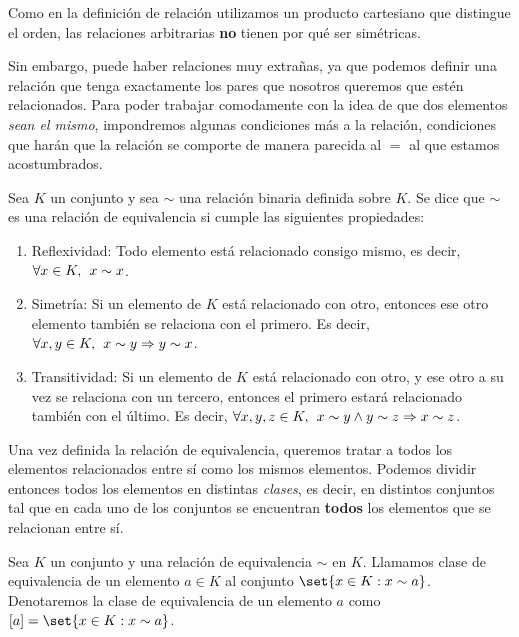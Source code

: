 \documentclass[../algebra_lineal.tex]{subfiles}
\begin{document}
\begin{remark}
    Como en la definición de relación utilizamos un producto cartesiano que distingue el orden, las relaciones arbitrarias \textbf{no} tienen por qué ser simétricas. 
\end{remark}

Sin embargo, puede haber relaciones muy extrañas, ya que podemos definir una relación que tenga exactamente los pares que nosotros queremos que estén relacionados. Para poder trabajar comodamente con la idea de que dos elementos \textit{sean el mismo}, impondremos algunas condiciones más a la relación, condiciones que harán que la relación se comporte de manera parecida al $=$ al que estamos acostumbrados.

\begin{definition}
    \label{definicion_relacion_equivalencia}
    Sea $K$ un conjunto y sea $\sim$ una relación binaria definida sobre $K$. Se dice que $\sim$ es una relación de equivalencia si cumple las siguientes propiedades:
    \begin{enumerate}
        \item Reflexividad: Todo elemento está relacionado consigo mismo, es decir, $\forall x \in K, \hspace{1.5mm} x \sim x$.
        \item Simetría: Si un elemento de $K$ está relacionado con otro, entonces ese otro elemento también se relaciona con el primero. Es decir, $\forall x, y \in K, \hspace{1.5mm} x \sim y \Rightarrow y \sim x$.
        \item Transitividad: Si un elemento de $K$ está relacionado con otro, y ese otro a su vez se relaciona con un tercero, entonces el primero estará relacionado también con el último. Es decir, $\forall x, y, z \in K, \hspace{1.5mm} x \sim y \land y \sim z \Rightarrow x \sim z$.
    \end{enumerate}
\end{definition}

Una vez definida la relación de equivalencia, queremos tratar a todos los elementos relacionados entre sí como los mismos elementos. Podemos dividir entonces todos los elementos en distintas \textit{clases}, es decir, en distintos conjuntos tal que en cada uno de los conjuntos se encuentran \textbf{todos} los elementos que se relacionan entre sí.

\begin{definition}
    Sea $K$ un conjunto y una relación de equivalencia $\sim$ en $K$. Llamamos clase de equivalencia de un elemento $a \in K$ al conjunto $\set{x \in K : x \sim a}$. Denotaremos la clase de equivalencia de un elemento $a$ como $[a] = \set{x \in K : x \sim a}$. 
\end{definition}
\end{document}
